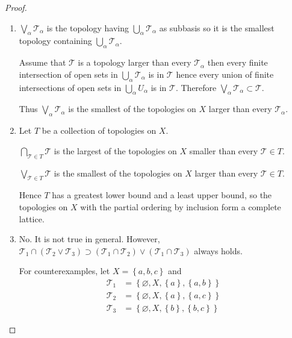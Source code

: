 \begin{proof}
    \begin{enumerate}[label={(\alph*)}]
        \item \(\bigvee_\alpha \mathscr{T}_\alpha\) is the topology having \(\bigcup_\alpha \mathscr{T}_\alpha\) as subbasis so it is the smallest topology containing \(\bigcup_\alpha \mathscr{T}_\alpha\).

              Assume that \( \mathscr{T} \) is a topology larger than every \( \mathscr{T}_{\alpha} \) then every finite intersection of open sets in \( \bigcup_{\alpha}\mathscr{T}_{\alpha} \) is in \( \mathscr{T} \) hence every union of finite intersections of open sets in \( \bigcup_{\alpha} U_{\alpha} \) is in \( \mathscr{T} \). Therefore \( \bigvee_\alpha \mathscr{T}_\alpha \subset \mathscr{T} \).

              Thus \( \bigvee_\alpha \mathscr{T}_\alpha \) is the smallest of the topologies on \(X\) larger than every \( \mathscr{T}_{\alpha} \).
        \item Let \( T \) be a collection of topologies on \( X \).

              \( \bigcap_{\mathscr{T} \in T} \mathscr{T} \) is the largest of the topologies on \( X \) smaller than every \( \mathscr{T} \in T \).

              \( \bigvee_{\mathscr{T} \in T} \mathscr{T} \) is the smallest of the topologies on \( X \) larger than every \( \mathscr{T} \in T \).

              Hence \( T \) has a greatest lower bound and a least upper bound, so the topologies on \(X\) with the partial ordering by inclusion form a complete lattice.
        \item No. It is not true in general. However, \( \mathscr{T}_{1} \cap (\mathscr{T}_{2} \vee \mathscr{T}_{3}) \supset (\mathscr{T}_{1} \cap \mathscr{T}_{2}) \vee (\mathscr{T}_{1} \cap \mathscr{T}_{3}) \) always holds.

              For counterexamples, let \( X = \left\{ a, b, c \right\} \) and
              \begingroup
              \allowdisplaybreaks%
              \begin{align*}
                  \mathscr{T}_{1} & = \left\{ \varnothing, X, \left\{ a \right\}, \left\{ a, b \right\} \right\} \\
                  \mathscr{T}_{2} & = \left\{ \varnothing, X, \left\{ a \right\}, \left\{ a, c \right\} \right\} \\
                  \mathscr{T}_{3} & = \left\{ \varnothing, X, \left\{ b \right\}, \left\{ b, c \right\} \right\}
              \end{align*}
              \endgroup


\end{enumerate}
\end{proof}
